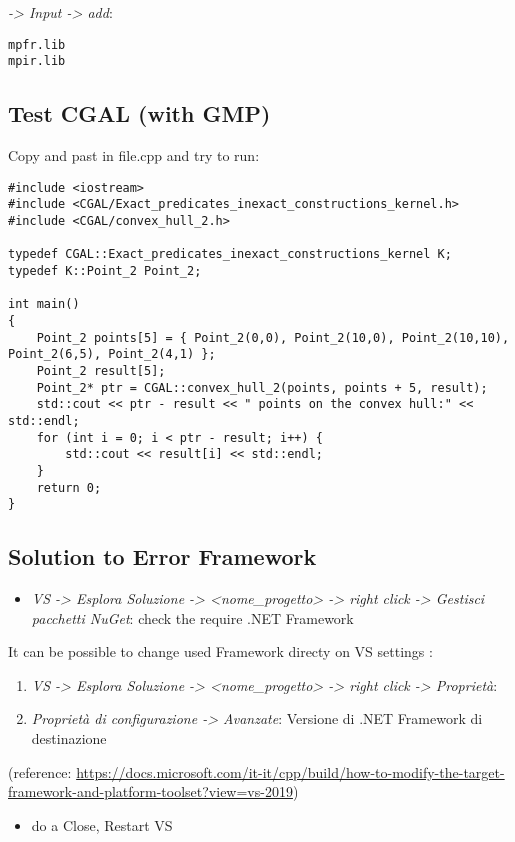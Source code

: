 \documentclass[10pt, english, openany]{report}
\begin{document}
\begin{appendices}
\begin{enumerate}
	 \textit{-> Input -> add}:
\begin{lstlisting}
mpfr.lib
mpir.lib	
\end{lstlisting}
\end{enumerate}
	
\subsection{Test CGAL (with GMP)}
Copy and past in file.cpp and try to run:

\begin{lstlisting}
#include <iostream>
#include <CGAL/Exact_predicates_inexact_constructions_kernel.h>
#include <CGAL/convex_hull_2.h>

typedef CGAL::Exact_predicates_inexact_constructions_kernel K;
typedef K::Point_2 Point_2;
    
int main()
{
	Point_2 points[5] = { Point_2(0,0), Point_2(10,0), Point_2(10,10), Point_2(6,5), Point_2(4,1) };
	Point_2 result[5];
	Point_2* ptr = CGAL::convex_hull_2(points, points + 5, result);
	std::cout << ptr - result << " points on the convex hull:" << std::endl;
	for (int i = 0; i < ptr - result; i++) {
		std::cout << result[i] << std::endl;
	}
	return 0;
}
\end{lstlisting}

\subsection{Solution to Error Framework}
\begin{itemize}
\item \textit{VS -> Esplora Soluzione -> <nome\_progetto> -> right click -> Gestisci pacchetti NuGet}: check the require .NET Framework
\end{itemize}
It can be possible to change used Framework directy on VS settings :
\begin{enumerate}
\item \textit{VS -> Esplora Soluzione -> <nome\_progetto> -> right click -> Proprietà}:
\item \textit{Proprietà di configurazione -> Avanzate}: Versione di .NET Framework di destinazione
\end{enumerate}
(reference: \href{https://docs.microsoft.com/it-it/cpp/build/how-to-modify-the-target-framework-and-platform-toolset?view=vs-2019}{https://docs.microsoft.com/it-it/cpp/build/how-to-modify-the-target-framework-and-platform-toolset?view=vs-2019})
\begin{itemize}
\item do a Close, Restart VS
\end{itemize}


\end{appendices}
\end{document}
